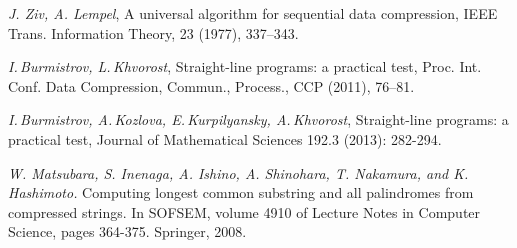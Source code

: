 \documentclass[14pt]{article}
\begin{document}
\begin{thebibliography}{99}
\textsl{J. Ziv, A. Lempel}, A universal algorithm for sequential data compression, IEEE Trans. Information Theory, 23 (1977), 337–343.

\textsl{I.\,Burmistrov, L.\,Khvorost}, Straight-line programs: a practical test, Proc. Int. Conf. Data Compression, Commun., Process., CCP
(2011), 76--81.

\textsl{I.\,Burmistrov, A.\,Kozlova, E.\,Kurpilyansky, A.\,Khvorost}, Straight-line programs: a practical test,
Journal of Mathematical Sciences 192.3 (2013): 282-294.

\textsl{W. Matsubara, S. Inenaga, A. Ishino, A. Shinohara, T. Nakamura, and
K. Hashimoto.} Computing longest common substring and all palindromes
from compressed strings. In SOFSEM, volume 4910 of Lecture Notes in
Computer Science, pages 364-375. Springer, 2008.

\end{thebibliography}
\end{document}
